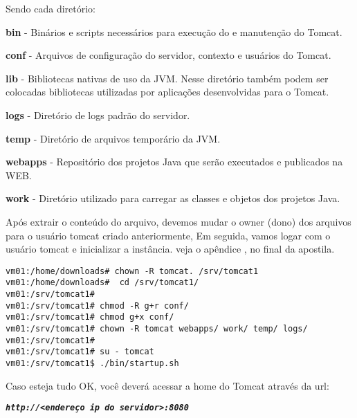Sendo cada diretório:

\begin{list}{•}{}
	\setlength{\leftskip}{1.5cm}
	\setlength{\rightskip}{0pt plus 1.0cm}
	\setlength{\parindent}{-1.5cm}
\item \textbf{bin} - Binários e scripts necessários para execução do e manutenção do Tomcat.
\item \textbf{conf} - Arquivos de configuração do servidor, contexto e usuários do Tomcat.
\item \textbf{lib} - Bibliotecas nativas de uso da JVM. Nesse diretório também podem ser colocadas bibliotecas utilizadas por aplicações desenvolvidas para o Tomcat.
\item \textbf{logs} - Diretório de logs padrão do servidor.
\item \textbf{temp} - Diretório de arquivos temporário da JVM.
\item \textbf{webapps} - Repositório dos projetos Java que serão executados e publicados na WEB.
\item \textbf{work} - Diretório utilizado para carregar as classes e objetos dos projetos Java.
\end{list}

Após extrair o conteúdo do arquivo, devemos mudar o owner (dono) dos arquivos para o usuário tomcat criado anteriormente, Em seguida, vamos logar com o usuário tomcat e inicializar a instância. veja o apêndice , no final da apostila.

\begin{lstlisting}[breaklines=true,basicstyle=\firacoderetina,
breaklines=true,caption=\firacoderetina Ajuste de permissões,
postbreak=\mbox{\textcolor{red}{$\hookrightarrow$}\space},
showstringspaces=false]
vm01:/home/downloads# chown -R tomcat. /srv/tomcat1
vm01:/home/downloads#  cd /srv/tomcat1/
vm01:/srv/tomcat1#   
vm01:/srv/tomcat1# chmod -R g+r conf/
vm01:/srv/tomcat1# chmod g+x conf/
vm01:/srv/tomcat1# chown -R tomcat webapps/ work/ temp/ logs/
vm01:/srv/tomcat1# 
vm01:/srv/tomcat1# su - tomcat
vm01:/srv/tomcat1$ ./bin/startup.sh

\end{lstlisting}

Caso esteja tudo OK, você deverá acessar a home do Tomcat através da url:

\begin{center}
	\texttt{{\small \emph{\textbf{http://<endereço ip do servidor>:8080}}}}
\end{center} 

